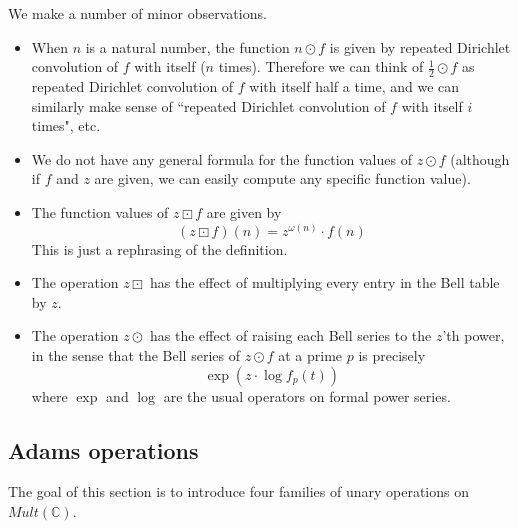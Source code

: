 \begin{remark}
We make a number of minor observations.
\begin{itemize}
\item When $n$ is a natural number, the function $n \odot f$ is given by repeated Dirichlet convolution of $f$ with itself ($n$ times). Therefore we can think of $\frac{1}{2} \odot f$ as repeated Dirichlet convolution of $f$ with itself half a time, and we can similarly make sense of ``repeated Dirichlet convolution of $f$ with itself $i$ times", etc. 
\item We do not have any general formula for the function values of $z \odot f$ (although if $f$ and $z$ are given, we can easily compute any specific function value). 
\item The function values of $z \boxdot f$ are given by
$$   (z \boxdot f)(n)  = z^{\omega(n)} \cdot f(n) $$ 
This is just a rephrasing of the definition.    
\item The operation $z \boxdot $ has the effect of multiplying every entry in the Bell table by $z$.
\item The operation $z \odot$ has the effect of raising each Bell series to the $z$'th power, in the sense that the Bell series of $z \odot f$ at a prime $p$ is precisely
$$    \exp (z \cdot \log f_p(t))   $$
where $\exp$ and $\log$ are the usual operators on formal power series.
\end{itemize}

\end{remark}

\subsection{Adams operations}

The goal of this section is to introduce four families of unary operations on $Mult(\mathbb{C})$.




